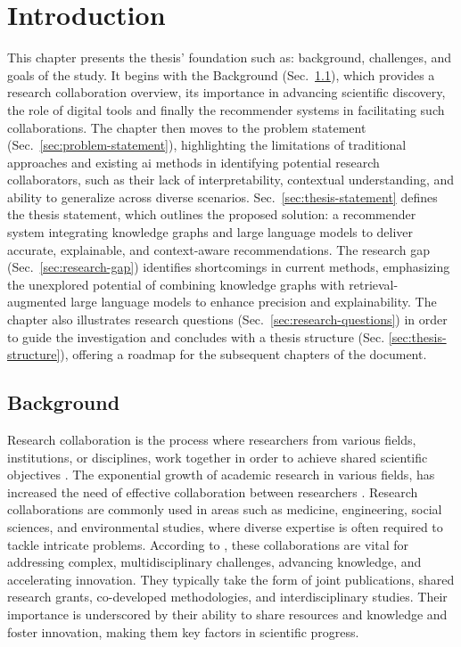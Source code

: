 \chapter{Introduction}\label{chap:intro}

This chapter presents the thesis' foundation such as: background, challenges, and goals of the study.
It begins with the Background (Sec.~\ref{sec:background}), which provides a research collaboration overview, its importance in advancing scientific discovery, the role of digital tools and finally the recommender systems in facilitating such collaborations.
The chapter then moves to the problem statement (Sec.~\ref{sec:problem-statement}), highlighting the limitations of traditional approaches and existing \gls{ai} methods in identifying potential research collaborators, such as their lack of interpretability, contextual understanding, and ability to generalize across diverse scenarios.
Sec.~\ref{sec:thesis-statement} defines the thesis statement, which outlines the proposed solution: a recommender system integrating knowledge graphs and large language models to deliver accurate, explainable, and context-aware recommendations.
The research gap (Sec.~\ref{sec:research-gap}) identifies shortcomings in current methods, emphasizing the unexplored potential of combining knowledge graphs with retrieval-augmented large language models to enhance precision and explainability.
The chapter also illustrates research questions (Sec.~\ref{sec:research-questions}) in order to guide the investigation and concludes with a thesis structure (Sec. \ref{sec:thesis-structure}), offering a roadmap for the subsequent chapters of the document.

\section{Background}\label{sec:background}
Research collaboration is the process where researchers from various fields, institutions, or disciplines, work together in order to achieve shared scientific objectives \cite{KATZ19971}.
The exponential growth of academic research in various fields, has increased the need of effective collaboration between researchers \cite{Adams2012, Vermeulen2017}.
Research collaborations are commonly used in areas such as medicine, engineering, social sciences, and environmental studies, where diverse expertise is often required to tackle intricate problems.
According to \textcite{Mei2021}, these collaborations are vital for addressing complex, multidisciplinary challenges, advancing knowledge, and accelerating innovation.
They typically take the form of joint publications, shared research grants, co-developed methodologies, and interdisciplinary studies.
Their importance is underscored by their ability to share resources and knowledge and foster innovation, making them key factors in scientific progress.

